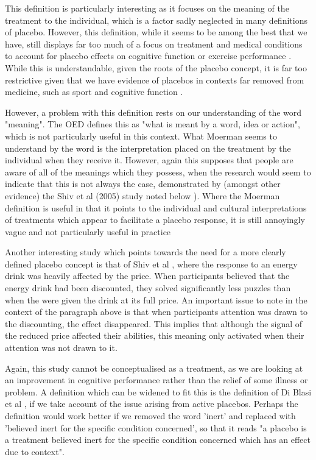 This definition is particularly interesting as it focuses on the meaning of the treatment to the individual, which is a factor sadly neglected in many definitions of placebo. However, this definition, while it seems to be among the best that we have, still displays far too much of a focus on treatment and medical conditions to account for placebo effects on cognitive function or exercise performance \cite{Crum2007} .  While this is understandable, given the roots of the placebo concept, it is far too restrictive given that we have evidence of placebos in contexts far removed from medicine, such as sport and cognitive function \cite{Benedetti2007a,Oken2008}. 

However, a problem with this definition rests on our understanding of the word "meaning". The OED defines this as "what is meant by a word, idea or action", which is not particularly useful in this context. What Moerman seems to understand by the word is the interpretation placed on the treatment by the individual when they receive it. However, again this supposes that people are aware of all of the meanings which they possess, when the research would seem to indicate that this is not always the case, demonstrated by (amongst other evidence) the Shiv et al (2005) study noted below  \cite{Shiv2005a}). Where the Moerman definition is useful in that it points to the individual and cultural interpretations of treatments which appear to facilitate a placebo response, it is still annoyingly vague and not particularly useful in practice %

Another interesting study which points towards the need for a more clearly defined placebo concept is that of Shiv et al \cite{Shiv2005a} , where the response to an energy drink was heavily affected by the price. When participants believed that the energy drink had been discounted, they solved significantly less puzzles than when the were given the drink at its full price. An important issue to note in the context of the paragraph above is that when participants attention was drawn to the discounting, the effect disappeared. This implies that although the signal of the reduced price affected their abilities, this meaning only activated when their attention was not drawn to it.

Again, this study cannot be conceptualised as a treatment, as we are looking at an improvement in cognitive performance rather than the relief of some illness or problem. A definition which can be widened to fit this is the definition of Di Blasi et al \cite{Blasi2001}, if we take account of the issue arising from active placebos. Perhaps the definition would work better if we removed the word 'inert' and replaced with 'believed inert for the specific condition concerned', so that it reads "a placebo is a treatment believed inert for the specific condition concerned which has an effect due to context".

